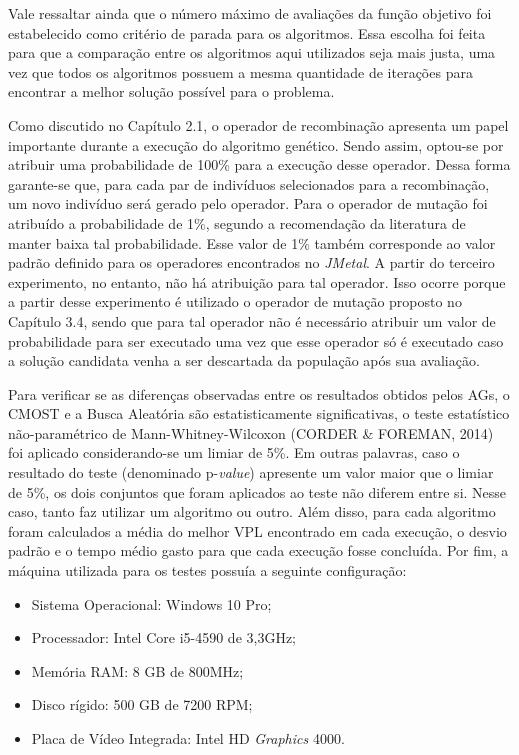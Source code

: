 Vale ressaltar ainda que o número máximo de avaliações da função objetivo foi estabelecido como critério de parada para os algoritmos. Essa escolha foi feita para que a comparação entre os algoritmos aqui utilizados seja mais justa, uma vez que todos os algoritmos possuem a mesma quantidade de iterações para encontrar a melhor solução possível para o problema. 

Como discutido no Capítulo 2.1, o operador de recombinação apresenta um papel importante durante a execução do algoritmo genético. Sendo assim, optou-se por atribuir uma probabilidade de 100\% para a execução desse operador. Dessa forma garante-se que, para cada par de indivíduos selecionados para a recombinação, um novo indivíduo será gerado pelo operador. Para o operador de mutação foi atribuído a probabilidade de 1\%, segundo a recomendação da literatura de manter baixa tal probabilidade. Esse valor de 1\% também corresponde ao valor padrão definido para os operadores encontrados no \textit{JMetal}. A partir do terceiro experimento, no entanto, não há atribuição para tal operador. Isso ocorre porque a partir desse experimento é utilizado o operador de mutação proposto no Capítulo 3.4, sendo que para tal operador não é necessário atribuir um valor de probabilidade para ser executado uma vez que esse operador só é executado caso a solução candidata venha a ser descartada da população após sua avaliação.

Para verificar se as diferenças observadas entre os resultados obtidos pelos AGs, o CMOST e a Busca Aleatória são estatisticamente significativas, o teste estatístico não-paramétrico de Mann-Whitney-Wilcoxon (CORDER \& FOREMAN, 2014) foi aplicado considerando-se um limiar de 5\%. Em outras palavras, caso o resultado do teste (denominado p-\textit{value}) apresente um valor maior que o limiar de 5\%, os dois conjuntos que foram aplicados ao teste não diferem entre si. Nesse caso, tanto faz utilizar um algoritmo ou outro. Além disso, para cada algoritmo foram calculados a média do melhor VPL encontrado em cada execução, o desvio padrão e o tempo médio gasto para que cada execução fosse concluída. Por fim, a máquina utilizada para os testes possuía a seguinte configuração:  

\begin{itemize}
\item Sistema Operacional: Windows 10 Pro;
\item Processador: Intel Core i5-4590 de 3,3GHz;
\item Memória RAM: 8 GB de 800MHz;
\item Disco rígido: 500 GB de 7200 RPM;
\item Placa de Vídeo Integrada: Intel HD \textit{Graphics} 4000.
\end{itemize}